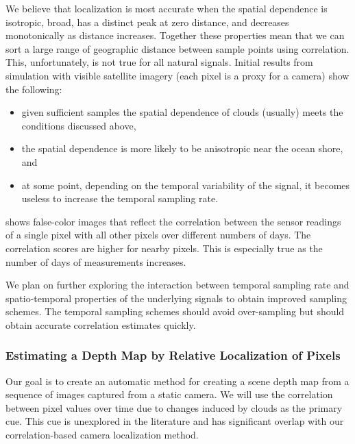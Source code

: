 We believe that localization is most accurate when the spatial
dependence is isotropic, broad, has a distinct peak at zero distance,
and decreases monotonically as distance increases.  Together these
properties mean that we can sort a large range of geographic distance
between sample points using correlation.  This, unfortunately, is not
true for all natural signals.  Initial results from simulation with
visible satellite imagery (each pixel is a proxy for a camera) show
the following:
\begin{itemize}

  \item given sufficient samples the spatial dependence of clouds
    (usually) meets the conditions discussed above,

  \item the spatial dependence is more likely to be anisotropic near
    the ocean shore, and 

  \item at some point, depending on the temporal variability of the
    signal, it becomes useless to increase the temporal sampling rate.

\end{itemize}

 shows false-color images that reflect the
correlation between the sensor readings of a single pixel with all
other pixels over different numbers of days. The correlation scores
are higher for nearby pixels.  This is especially true as the number
of days of measurements increases.


We plan on further exploring the interaction between temporal sampling
rate and spatio-temporal properties of the underlying signals to
obtain improved sampling schemes.  The temporal sampling schemes
should avoid over-sampling but should obtain accurate correlation
estimates quickly.   

\subsubsection{Estimating a Depth Map by Relative Localization of Pixels}

Our goal is to create an automatic method for creating a scene depth
map from a sequence of images captured from a static camera.  We will
use the correlation between pixel values over time due to changes
induced by clouds as the primary cue.  This cue is unexplored in the
literature and has significant overlap with our correlation-based
camera localization method.

